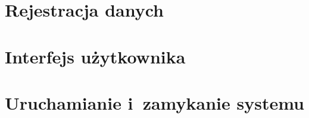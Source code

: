 \section{Rejestracja danych}
\label{sec:rejestracja}

\section{Interfejs użytkownika}
\label{sec:interfejs}

\section{Uruchamianie i~zamykanie systemu}
\label{sec:start_stop}
